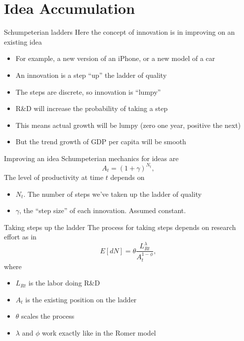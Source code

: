 \section{Idea Accumulation}
\begin{frame}{Schumpeterian ladders}
Here the concept of innovation is in improving on an existing idea
\begin{itemize}
	\item For example, a new version of an iPhone, or a new model of a car
	\item An innovation is a step ``up'' the ladder of quality
	\item The steps are discrete, so innovation is ``lumpy''
	\item R\&D will increase the probability of taking a step
	\item This means actual growth will be lumpy (zero one year, positive the next)
	\item But the trend growth of GDP per capita will be smooth
\end{itemize}
\end{frame}

\begin{frame}{Improving an idea}
Schumpeterian mechanics for ideas are
\begin{equation}
	A_t = (1+\gamma)^{N_t}, \label{EQ_A_N}
\end{equation}
The level of productivity at time $t$ depends on 
\begin{itemize}
	\item $N_t$. The number of steps we've taken up the ladder of quality
	\item $\gamma$, the ``step size'' of each innovation. Assumed constant.
\end{itemize}
\end{frame}

\begin{frame}{Taking steps up the ladder}
The process for taking steps depends on research effort as in 
\begin{equation}
	E[dN] = \theta \frac{L_{Rt}^{\lambda}}{A_t^{1-\phi}}, \label{EQ_dotN}
\end{equation}
where
\begin{itemize}
	\item $L_{Rt}$ is the labor doing R\&D
	\item $A_t$ is the existing position on the ladder
	\item $\theta$ scales the process
	\item $\lambda$ and $\phi$ work exactly like in the Romer model
\end{itemize}
\end{frame}

